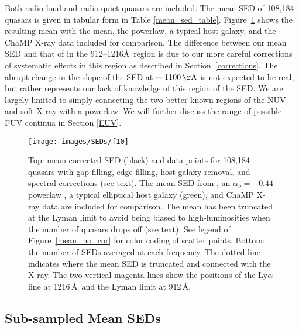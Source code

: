 Both radio-loud and radio-quiet quasars are included.  The mean SED of 108,184 quasars is given in tabular form in Table \ref{mean_sed_table}.  Figure~\ref{mean_gap_cor} shows the resulting mean with the \citet{Richards:2006} mean, the \citet{Vanden-Berk:2001} powerlaw, a typical host galaxy, and the ChaMP X-ray data included for comparison.  The difference between our mean SED and that of  \citet{Richards:2006}  in the 912--1216\AA\ region is due to our more careful corrections of systematic effects in this region as described in Section~\ref{corrections}.  The abrupt change in the slope of the SED at $\sim 1100\,{\rm \AA}$ is not expected to be real, but rather represents our lack of knowledge of this region of the SED. We are largely limited to simply connecting the two better known regions of the NUV and soft X-ray with a powerlaw. We will further discuss the range of possible FUV continua in Section \ref{EUV}.



\begin{figure}[t]
 \centering
 \texttt{[image: images/SEDs/f10]}
 \caption[Corrected mean SED]{Top: mean corrected SED (black) and data points for 108,184 quasars with gap filling, edge filling, host galaxy removal, and spectral corrections (see text).  The mean SED from \citet[][cyan]{Richards:2006}, an $\alpha_{\nu}=-0.44$ powerlaw \citep[][dashed grey]{Vanden-Berk:2001}, a typical elliptical host galaxy (green), and ChaMP X-ray data \citep[][black crosses]{Green:2009} are included for comparison. The mean has been truncated at the Lyman limit to avoid being biased to high-luminosities when the number of quasars drops off (see text).
 See legend of Figure~\ref{mean_no_cor} for color coding of scatter points.
 Bottom: the number of SEDs averaged at each frequency. The dotted line indicates where the mean SED is truncated and connected with the X-ray. The two vertical magenta lines show the positions of the Ly$\alpha$ line at 1216\,\AA\ and the Lyman limit at 912\,\AA.  
}
 \label{mean_gap_cor}
\end{figure}

\subsection{Sub-sampled Mean SEDs}

